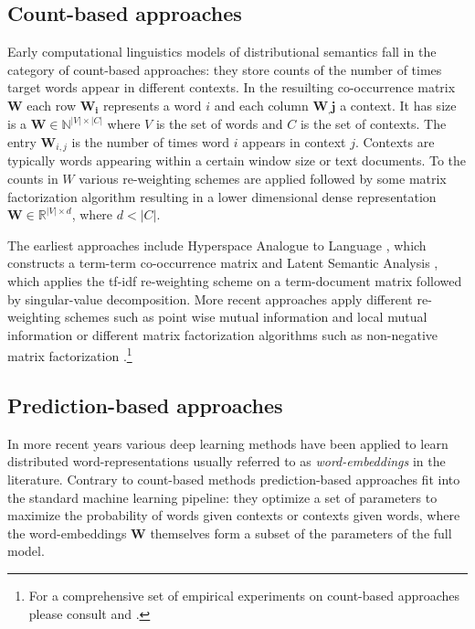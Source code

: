 \subsection{Count-based approaches}
\label{sec:count}

Early computational linguistics models of distributional semantics fall in the category of
count-based approaches: they store counts of the number of times target words appear in different
contexts. In the  resuilting co-occurrence matrix
$\mathbf{W}$ each row $\mathbf{W_i}$ represents a 
word $i$ and each column $\mathbf{W_,j}$ a context. It has size
is a $\mathbf{W} \in \mathbb{N}^{|V| \times |C|}$ where $V$ is the set of words and $C$ is
the set of contexts.
The entry $\mathbf{W}_{i,j}$ is the number of times word $i$ appears in context $j$.
Contexts are typically words appearing within a certain window size or text documents.
To the counts in $W$ various re-weighting schemes are applied followed by some matrix factorization algorithm
resulting in a lower dimensional dense representation $\mathbf{W} \in \mathbb{R}^{|V| \times d}$, 
where $d < |C|$.

The earliest approaches include Hyperspace Analogue to Language \citep{lund1996producing},
which constructs a term-term co-occurrence matrix and Latent Semantic Analysis \citep{dumais2004latent},
which applies the tf-idf re-weighting scheme on a term-document matrix 
followed by singular-value decomposition.
More recent approaches apply different re-weighting schemes such as 
point wise mutual information \cite{bullinaria2007extracting}  and local mutual
information \citep{evert2005statistics} or different matrix factorization algorithms such as non-negative
matrix factorization \citep{baroni2014don}.\footnote{For a comprehensive set of empirical experiments on count-based
approaches please consult \cite{bullinaria2007extracting} and \cite{bullinaria2012extracting}.} 
\subsection{Prediction-based approaches}
\label{sec:pred}
In more recent years
various deep learning methods have been applied to learn distributed word-representations usually referred to
as \emph{word-embeddings} in the literature. 
Contrary to count-based methods prediction-based approaches fit into the
standard machine learning pipeline: they optimize a set of parameters to maximize the probability of words
given contexts or contexts given words, where the word-embeddings $\mathbf{W}$
themselves form a subset of the parameters of the full model. 

